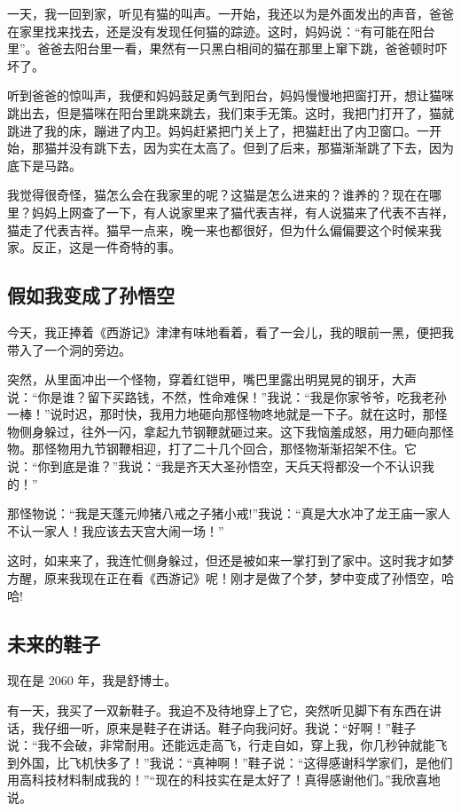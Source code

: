 \documentclass[UTF8,a4paper,titlepage,twoside,10.5pt]{article}
\begin{document}
一天，我一回到家，听见有猫的叫声。一开始，我还以为是外面发出的声音，爸爸在家里找来找去，还是没有发现任何猫的踪迹。这时，妈妈说：“有可能在阳台里”。爸爸去阳台里一看，果然有一只黑白相间的猫在那里上窜下跳，爸爸顿时吓坏了。

听到爸爸的惊叫声，我便和妈妈鼓足勇气到阳台，妈妈慢慢地把窗打开，想让猫咪跳出去，但是猫咪在阳台里跳来跳去，我们束手无策。这时，我把门打开了，猫就跳进了我的床，蹦进了内卫。妈妈赶紧把门关上了，把猫赶出了内卫窗口。一开始，那猫并没有跳下去，因为实在太高了。但到了后来，那猫渐渐跳了下去，因为底下是马路。

我觉得很奇怪，猫怎么会在我家里的呢？这猫是怎么进来的？谁养的？现在在哪里？妈妈上网查了一下，有人说家里来了猫代表吉祥，有人说猫来了代表不吉祥，猫走了代表吉祥。猫早一点来，晚一来也都很好，但为什么偏偏要这个时候来我家。反正，这是一件奇特的事。

\subsection{假如我变成了孙悟空}
\label{sec:org42a1568}

今天，我正捧着《西游记》津津有味地看着，看了一会儿，我的眼前一黑，便把我带入了一个洞的旁边。

突然，从里面冲出一个怪物，穿着红铠甲，嘴巴里露出明晃晃的钢牙，大声说：“你是谁？留下买路钱，不然，性命难保！”我说：“我是你家爷爷，吃我老孙一棒！”说时迟，那时快，我用力地砸向那怪物咚地就是一下子。就在这时，那怪物侧身躲过，往外一闪，拿起九节钢鞭就砸过来。这下我恼羞成怒，用力砸向那怪物。那怪物用九节钢鞭相迎，打了二十几个回合，那怪物渐渐招架不住。它说：“你到底是谁？”我说：“我是齐天大圣孙悟空，天兵天将都没一个不认识我的！”

那怪物说：“我是天蓬元帅猪八戒之子猪小戒!”我说：“真是大水冲了龙王庙一家人不认一家人！我应该去天宫大闹一场！”

这时，如来来了，我连忙侧身躲过，但还是被如来一掌打到了家中。这时我才如梦方醒，原来我现在正在看《西游记》呢！刚才是做了个梦，梦中变成了孙悟空，哈哈!

\subsection{未来的鞋子}
\label{sec:orgcbd442a}

现在是 2060 年，我是舒博士。

有一天，我买了一双新鞋子。我迫不及待地穿上了它，突然听见脚下有东西在讲话，我仔细一听，原来是鞋子在讲话。鞋子向我问好。我说：“好啊！”鞋子说：“我不会破，非常耐用。还能远走高飞，行走自如，穿上我，你几秒钟就能飞到外国，比飞机快多了！”我说：“真神啊！”鞋子说：“这得感谢科学家们，是他们用高科技材料制成我的！”“现在的科技实在是太好了！真得感谢他们。”我欣喜地说。
\end{document}
